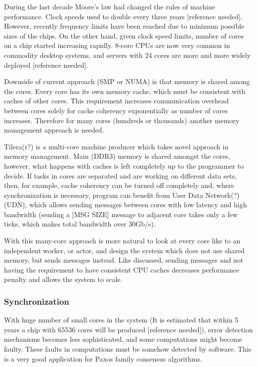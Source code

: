 \documentclass[english,11pt]{article}
\numberwithin{equation}{section}
\begin{document}
During the last decade Moore's law had changed the rules of machine
performance. Clock speeds used to double every three years [reference needed].
However, recently frequency limits have been reached due to minimum possible
sizes of the chips. On the other hand, given clock speed limits, number of
cores on a chip started increasing rapidly. 8-core CPUs are now very common in
commodity desktop systems, and servers with 24 cores are more and more widely
deployed [reference needed].

Downside of current approach (SMP or NUMA) is that memory is shared among the
cores. Every core has its own memory cache, which must be consistent with
caches of other cores. This requirement increases communication overhead
between cores solely for cache coherency exponentially as number of cores
increases. Therefore for many cores (hundreds or thousands) another memory
management approach is needed.

Tilera(r?) is a multi-core machine producer which takes novel approach in
memory management. Main (DDR3) memory is shared amongst the cores, however,
what happens with caches is left completely up to the programmer to decide.  If
tasks in cores are separated and are working on different data sets, then, for
example, cache coherency can be turned off completely and, where
synchronization is necessary, program can benefit from User Data Network(?)
(UDN), which allows sending messages between cores with low latency and high
bandwidth (sending a [MSG SIZE] message to adjacent core takes only a few ticks,
which makes total bandwidth over 30Gb/s).

With this many-core approach is more natural to look at every core like to an
independent worker, or actor, and design the system which does not use shared
memory, but sends messages instead. Like discussed, sending messages and not
having the requirement to have consistent CPU caches decreases performance
penalty and allows the system to scale.

\subsubsection{Synchronization}

With huge number of small cores in the system (It is estimated that within 5
years a chip with 65536 cores will be produced [reference needed]), error
detection mechanisms becomes less sophisticated, and some computations might
become faulty. These faults in computations must be somehow detected by
software. This is a very good application for Paxos family consensus
algorithms.
\end{document}
